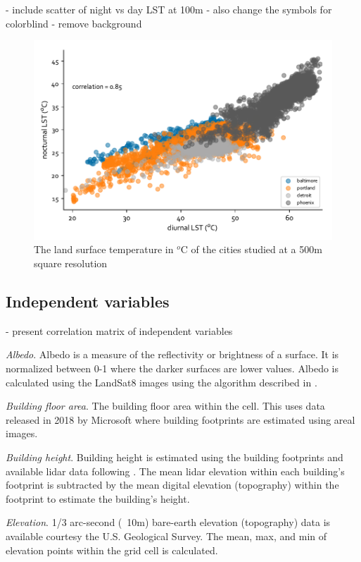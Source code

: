\documentclass[]{elsarticle}
\begin{document}
- include scatter of night vs day LST at 100m - also change the symbols for colorblind - remove background
\begin{figure}[h]
\begin{center}
\includegraphics[width=\textwidth]{fig/report/lst_night-vs-day_500.pdf}
\caption{The land surface temperature in $^o$C of the cities studied at a 500m square resolution}
\label{fig:scatter_lst}
\end{center}
\end{figure}
\subsection{Independent variables}
- present correlation matrix of independent variables

\textit{Albedo}. Albedo is a measure of the reflectivity or brightness of a surface. It is normalized between 0-1 where the darker surfaces are lower values. Albedo is calculated using the LandSat8 images using the algorithm described in \cite{Smith2010-nw, Liang2001-jd}. 

\textit{Building floor area}. The building floor area within the cell. This uses data released in 2018 by Microsoft where building footprints are estimated using areal images. 

\textit{Building height}. Building height is estimated using the building footprints and available lidar data following \cite{Chun2017-mm}. The mean lidar elevation within each building's footprint is subtracted by the mean digital elevation (topography) within the footprint to estimate the building's height.

\textit{Elevation}. 1/3 arc-second (~10m) bare-earth elevation (topography) data is available courtesy the U.S. Geological Survey. The mean, max, and min of elevation points within the grid cell is calculated.
\end{document}
